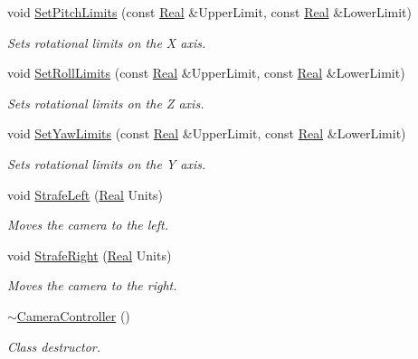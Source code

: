\begin{DoxyCompactItemize}
void \hyperlink{classMezzanine_1_1CameraController_afbf7f8b9b27f565e4002ea2944724b2f}{SetPitchLimits} (const \hyperlink{namespaceMezzanine_a726731b1a7df72bf3583e4a97282c6f6}{Real} \&UpperLimit, const \hyperlink{namespaceMezzanine_a726731b1a7df72bf3583e4a97282c6f6}{Real} \&LowerLimit)
\begin{DoxyCompactList}\small\item\em Sets rotational limits on the X axis. \item\end{DoxyCompactList}\item 
void \hyperlink{classMezzanine_1_1CameraController_aeda898e8a4e244eec905478b7f033c41}{SetRollLimits} (const \hyperlink{namespaceMezzanine_a726731b1a7df72bf3583e4a97282c6f6}{Real} \&UpperLimit, const \hyperlink{namespaceMezzanine_a726731b1a7df72bf3583e4a97282c6f6}{Real} \&LowerLimit)
\begin{DoxyCompactList}\small\item\em Sets rotational limits on the Z axis. \item\end{DoxyCompactList}\item 
void \hyperlink{classMezzanine_1_1CameraController_a99491e652e97e725ec058834c2d17b70}{SetYawLimits} (const \hyperlink{namespaceMezzanine_a726731b1a7df72bf3583e4a97282c6f6}{Real} \&UpperLimit, const \hyperlink{namespaceMezzanine_a726731b1a7df72bf3583e4a97282c6f6}{Real} \&LowerLimit)
\begin{DoxyCompactList}\small\item\em Sets rotational limits on the Y axis. \item\end{DoxyCompactList}\item 
void \hyperlink{classMezzanine_1_1CameraController_a6297e8a56f401bd2967032a6370c07b8}{StrafeLeft} (\hyperlink{namespaceMezzanine_a726731b1a7df72bf3583e4a97282c6f6}{Real} Units)
\begin{DoxyCompactList}\small\item\em Moves the camera to the left. \item\end{DoxyCompactList}\item 
void \hyperlink{classMezzanine_1_1CameraController_a37e9081283df3f3f7129879e01ee62ae}{StrafeRight} (\hyperlink{namespaceMezzanine_a726731b1a7df72bf3583e4a97282c6f6}{Real} Units)
\begin{DoxyCompactList}\small\item\em Moves the camera to the right. \item\end{DoxyCompactList}\item 
\hypertarget{classMezzanine_1_1CameraController_a2facf8224198fd2b820b24304abc42b4}{
\hyperlink{classMezzanine_1_1CameraController_a2facf8224198fd2b820b24304abc42b4}{$\sim$CameraController} ()}
\label{classMezzanine_1_1CameraController_a2facf8224198fd2b820b24304abc42b4}

\begin{DoxyCompactList}\small\item\em Class destructor. \item\end{DoxyCompactList}\end{DoxyCompactItemize}
